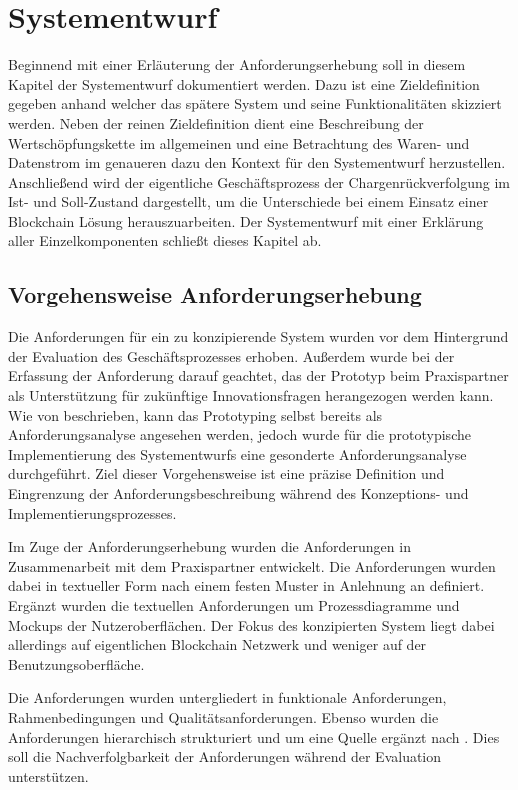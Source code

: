 \section{Systementwurf}
Beginnend mit einer Erläuterung der Anforderungserhebung soll in diesem Kapitel der Systementwurf dokumentiert werden. Dazu ist eine Zieldefinition gegeben anhand welcher das spätere System und seine Funktionalitäten skizziert werden. Neben der reinen Zieldefinition dient eine Beschreibung der Wertschöpfungskette im allgemeinen und eine Betrachtung des Waren- und Datenstrom im genaueren dazu den Kontext für den Systementwurf herzustellen. Anschließend wird der eigentliche Geschäftsprozess der Chargenrückverfolgung im Ist- und Soll-Zustand dargestellt, um die Unterschiede bei einem Einsatz einer Blockchain Lösung herauszuarbeiten. Der Systementwurf mit einer Erklärung aller Einzelkomponenten schließt dieses Kapitel ab.

\subsection{Vorgehensweise Anforderungserhebung}
Die Anforderungen für ein zu konzipierende System wurden vor dem Hintergrund der Evaluation des Geschäftsprozesses erhoben. Außerdem wurde bei der Erfassung der Anforderung darauf geachtet, das der Prototyp beim Praxispartner als Unterstützung für zukünftige Innovationsfragen herangezogen werden kann. Wie von \citet{Dick2017, HullElizabeth2011} beschrieben, kann das Prototyping selbst bereits als Anforderungsanalyse angesehen werden, jedoch wurde für die prototypische Implementierung des Systementwurfs eine gesonderte Anforderungsanalyse durchgeführt. Ziel dieser Vorgehensweise ist eine präzise Definition und Eingrenzung der Anforderungsbeschreibung während des Konzeptions- und Implementierungsprozesses.

Im Zuge der Anforderungserhebung wurden die Anforderungen in Zusammenarbeit mit dem Praxispartner entwickelt. Die Anforderungen wurden dabei in textueller Form nach einem festen Muster in Anlehnung an \citet{PohlKlaus2015} definiert. Ergänzt wurden die textuellen Anforderungen um Prozessdiagramme und Mockups der Nutzeroberflächen. Der Fokus des konzipierten System liegt dabei allerdings auf eigentlichen Blockchain Netzwerk und weniger auf der Benutzungsoberfläche.

Die Anforderungen wurden untergliedert in funktionale Anforderungen, Rahmenbedingungen und Qualitätsanforderungen. Ebenso wurden die Anforderungen hierarchisch strukturiert und um eine Quelle ergänzt nach \citet{Koelsch2016}. Dies soll die Nachverfolgbarkeit der Anforderungen während der Evaluation unterstützen.

